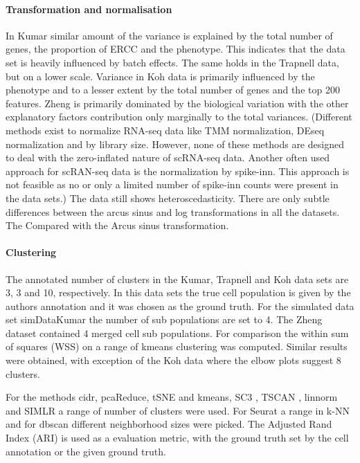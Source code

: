 \documentclass[11pt, a4paper]{article}\usepackage[]{graphicx}\usepackage[]{color}
\begin{document}
\paragraph{Transformation and normalisation}
In  Kumar similar amount of the variance is explained by the total number of genes, the proportion of ERCC and the phenotype. This indicates that the data set is heavily influenced by batch effects. The same holds in the Trapnell data, but on a lower scale. Variance in Koh data is primarily influenced by the phenotype and to a lesser extent by the total number of genes and the top 200 features. 
Zheng is primarily dominated by the biological variation with the other explanatory factors contribution only marginally to the total variances.
(Different methods exist to normalize RNA-seq data like TMM normalization, DEseq normalization and by library size. However, none of these methods are designed to deal with the zero-inflated nature of scRNA-seq data\citet{lun2016pooling}.
Another often used approach for scRAN-seq data is the normalization by spike-inn. This approach is not feasible as no or only a limited number of spike-inn counts were present in the data sets.)
The data still shows heteroscedasticity. There are only subtle differences between the arcus sinus and log transformations in all the datasets. The Compared with the Arcus sinus transformation.
\paragraph{Clustering}
The annotated number of clusters in the  Kumar, Trapnell and Koh data sets are 3, 3 and 10, respectively. 
In this data sets the true cell population is  given by the authors annotation and it was  chosen as the ground truth. For the simulated data set simDataKumar the number of sub populations are set to 4. The Zheng dataset contained 4 merged cell sub populations. 
For comparison the within sum of squares (WSS) on a range of kmeans clustering was computed.  Similar results were obtained, with exception of the Koh data where the elbow plots suggest 8 clusters.   

For the  methods cidr, pcaReduce, tSNE and kmeans, SC3 , TSCAN , linnorm and SIMLR a range of number of clusters were used. For Seurat a range in k-NN and for dbscan different neighborhood sizes were picked. The Adjusted Rand Index (ARI) is used as a evaluation metric, with the ground truth set by the cell annotation or the given ground truth.
\end{document}
